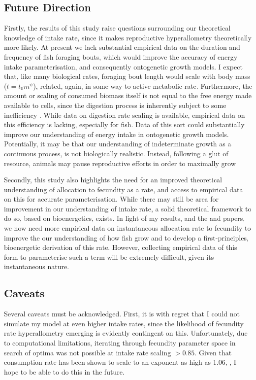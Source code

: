 \documentclass[a4paper]{article} %
\begin{document}
\subsection{Future Direction}
Firstly, the results of this study raise questions surrounding our theoretical knowledge of intake rate, since it makes reproductive hyperallometry theoretically more likely. At present we lack substantial empirical data on the duration and frequency of fish foraging bouts, which would improve the accuracy of energy intake parameterisation, and consequently ontogenetic growth models.  I expect that, like many biological rates, foraging bout length would scale with body mass ($t = t_{0}m^{\psi}$), related, again, in some way to active metabolic rate. Furthermore, the amount or scaling of consumed biomass itself is not equal to the free energy made available to cells, since the digestion process is inherently subject to some inefficiency \autocite{VanGemert2019}. While data on digestion rate scaling is available, empirical data on this efficiency is lacking, especially for fish. Data of this sort could substantially improve our understanding of energy intake in ontogenetic growth models. Potentially, it may be that our understanding of indeterminate growth as a continuous process, is not biologically realistic. Instead, following a glut of resource, animals may pause reproductive efforts in order to maximally grow \autocite{Kozowski1987-indeterminate}

Secondly, this study also highlights the need for an improved theoretical understanding of allocation to fecundity as a rate, and access to empirical data on this for accurate parameterisation. While there may still be area for improvement in our understanding of intake rate, a solid theoretical framework to do so, based on bioenergetics, exists. In light of my results, and the \textcite{Barneche2018-reproductive_output} and \textcite{Marshall2019b} papers, we now need more empirical data on instantaneous allocation rate to fecundity to improve the our understanding of how fish grow and to develop a first-principles, bioenergetic derivation of this rate. However, collecting empirical data of this form to parameterise such a term will be extremely difficult, given its instantaneous nature.

\subsection{Caveats}
Several caveats must be acknowledged. First, it is with regret that I could not simulate my model at even higher intake rates, since the likelihood of fecundity rate hyperallometry emerging is evidently contingent on this. Unfortunately, due to computational limitations, iterating through fecundity parameter space in search of optima was not possible at intake rate scaling $> 0.85$. Given that consumption rate has been shown to scale to an exponent as high as 1.06, \autocite{Pawar2012}, I hope to be able to do this in the future.
\end{document}
